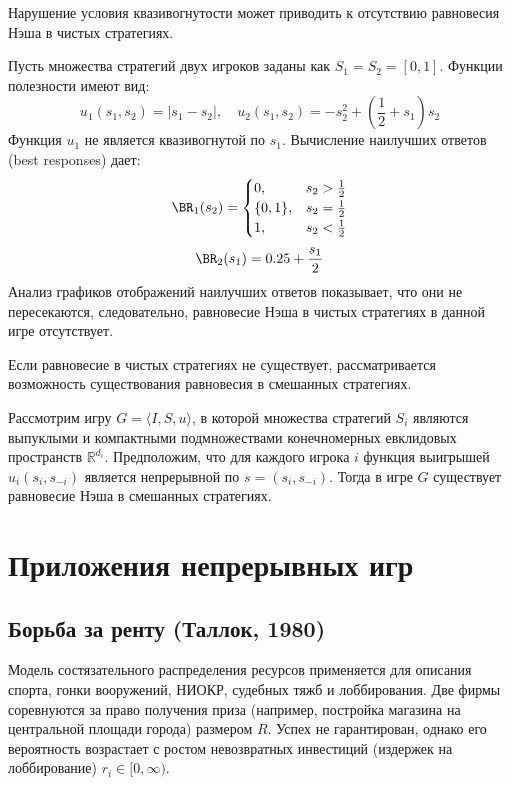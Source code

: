 Нарушение условия квазивогнутости может приводить к отсутствию равновесия Нэша в чистых стратегиях.

\begin{example}
Пусть множества стратегий двух игроков заданы как $S_1 = S_2 = [0, 1]$. Функции полезности имеют вид:
\[
u_1(s_1, s_2) = |s_1 - s_2|, \quad u_2(s_1, s_2) = -s_2^2 + \left(\frac{1}{2} + s_1\right) s_2
\]
Функция $u_1$ не является квазивогнутой по $s_1$. Вычисление наилучших ответов (best responses) дает:
\[
\BR_1(s_2) = 
\begin{cases} 
0, & s_2 > \frac{1}{2} \\
\{0, 1\}, & s_2 = \frac{1}{2} \\
1, & s_2 < \frac{1}{2}
\end{cases}
\]
\[
\BR_2(s_1) = 0.25 + \frac{s_1}{2}
\]
Анализ графиков отображений наилучших ответов показывает, что они не пересекаются, следовательно, равновесие Нэша в чистых стратегиях в данной игре отсутствует.
\end{example}

Если равновесие в чистых стратегиях не существует, рассматривается возможность существования равновесия в смешанных стратегиях.

\begin{theorem}
Рассмотрим игру $G = \langle I, S, u \rangle$, в которой множества стратегий $S_i$ являются выпуклыми и компактными подмножествами конечномерных евклидовых пространств $\mathbb{R}^{d_i}$. Предположим, что для каждого игрока $i$ функция выигрышей $u_i(s_i, s_{-i})$ является непрерывной по $s = (s_i, s_{-i})$. Тогда в игре $G$ существует равновесие Нэша в смешанных стратегиях.
\end{theorem}


\section{Приложения непрерывных игр}

\subsection{Борьба за ренту (Таллок, 1980)}

Модель состязательного распределения ресурсов применяется для описания спорта, гонки вооружений, НИОКР, судебных тяжб и лоббирования. Две фирмы соревнуются за право получения приза (например, постройка магазина на центральной площади города) размером $R$. Успех не гарантирован, однако его вероятность возрастает с ростом невозвратных инвестиций (издержек на лоббирование) $r_i \in [0, \infty)$.

